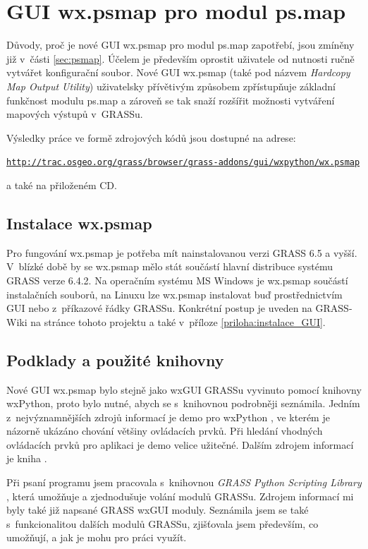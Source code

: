 \documentclass[a4paper,12pt,draft]{article}
\begin{document}
\section{GUI wx.psmap pro modul ps.map}
\label{sec:gui}

Důvody, proč je nové GUI wx.psmap pro
modul ps.map zapotřebí, jsou zmíněny již v~části
\ref{sec:psmap}. Účelem je především oprostit uživatele od nutnosti
ručně vytvářet konfigurační soubor. Nové GUI wx.psmap (také
pod názvem \emph{Hardcopy Map Output Utility}) uživatelsky
přívětivým způsobem zpřístupňuje zá\-kladní funkčnost modulu
ps.map a zároveň se tak snaží rozšířit možnosti vytváření
mapových výstupů v~GRASSu.

Výsledky práce ve formě zdrojových kódů jsou dostupné na adrese:

\begin{alltt}\small
\url{http://trac.osgeo.org/grass/browser/grass-addons/gui/wxpython/wx.psmap}
\end{alltt}


a také na přiloženém CD.

\subsection{Instalace wx.psmap}
Pro fungování wx.psmap je potřeba mít nainstalovanou verzi
GRASS 6.5 a vyšší. V~blízké době by se wx.psmap mělo stát součástí hlavní
distribuce systému GRASS verze 6.4.2. Na operačním systému MS Windows je
wx.psmap součástí instalačních souborů, na Linuxu lze wx.psmap instalovat buď
prostřednictvím GUI nebo z~pří\-kazové řádky GRASSu. Konkrétní
postup je uveden na GRASS-Wiki na stránce tohoto projektu
 \cite{wiki_wxpsmap} a také v~příloze \ref{priloha:instalace_GUI}.

\subsection{Podklady a použité knihovny}
Nové GUI wx.psmap bylo stejně jako wxGUI
GRASSu vyvinuto pomocí knihovny wxPython,
proto bylo nutné, abych se s~knihovnou podrobněji seznámila. Jedním
z~nejvýznamnějších zdrojů informací je demo pro wxPython \cite{demo},
ve kterém je názorně ukázáno chování většiny ovládacích
prvků. Při hledání vhodných ovláda\-cích prvků pro aplikaci je demo velice
užitečné.
Dalším zdrojem informací je kniha \cite{wxPythonInAction}.

Při psaní programu jsem pracovala s~knihovnou \emph{GRASS Python
Scripting Library} \cite{script}, která umožňuje a zjednodušuje
volání modulů GRASSu. Zdrojem informací mi byly také
již napsané GRASS wxGUI moduly. Seznámila jsem se také s~funkcionalitou
dalších  modulů GRASSu, zjišťovala
jsem především, co umožňují, a jak je mohu pro práci využít.
\end{document}
